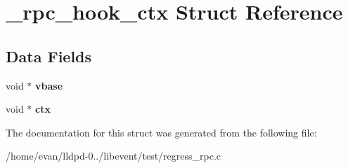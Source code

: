 \section{\-\_\-rpc\-\_\-hook\-\_\-ctx \-Struct \-Reference}
\label{struct__rpc__hook__ctx}
\subsection*{\-Data \-Fields}
\begin{DoxyCompactItemize}
\item 
void $\ast$ {\bfseries vbase}\label{struct__rpc__hook__ctx_a3e17ac8ea1248d1d3d8d0e69b4de9379}

\item 
void $\ast$ {\bfseries ctx}\label{struct__rpc__hook__ctx_a1f6d09b30c54854dfca659b7463ac207}

\end{DoxyCompactItemize}


\-The documentation for this struct was generated from the following file\-:\begin{DoxyCompactItemize}
\item 
/home/evan/lldpd-\/0../libevent/test/regress\-\_\-rpc.\-c\end{DoxyCompactItemize}
